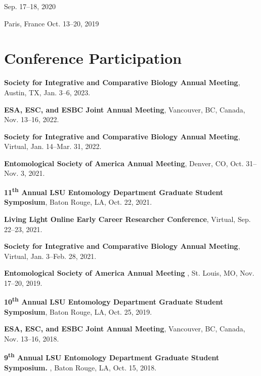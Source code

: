 \documentclass{article}
\newcommand{\ts}{\textsuperscript}
\newcommand{\hindent}{\hangindent=10pt}
\begin{document}
{Sep. 17--18, 2020}

{Paris, France}
{Oct. 13--20, 2019}




\section{Conference Participation}
\newcommand{\conference}[3]{
    \noindent
    \hindent
    \small
    \textbf{#1}, %
    {#3}, %
    {#2}. %
    \normalsize \par
}

\conference{Society for Integrative and Comparative Biology Annual Meeting}
{Jan. 3--6, 2023}
{Austin, TX}

\conference{ESA, ESC, and ESBC Joint Annual Meeting}
{Nov. 13--16, 2022}
{Vancouver, BC, Canada}

\conference{Society for Integrative and Comparative Biology Annual Meeting}
{Jan. 14--Mar. 31, 2022}
{Virtual}

\conference{Entomological Society of America Annual Meeting}
{Oct. 31--Nov. 3, 2021}
{Denver, CO}

\conference{11\ts{th} Annual LSU Entomology Department Graduate Student Symposium}
{Oct. 22, 2021}
{Baton Rouge, LA}

\conference{Living Light Online Early Career Researcher Conference}
{Sep. 22--23, 2021}
{Virtual}

\conference{Society for Integrative and Comparative Biology Annual Meeting}
{Jan. 3--Feb. 28, 2021}
{Virtual}

\conference{Entomological Society of America Annual Meeting }
{Nov. 17--20, 2019}
{St. Louis, MO}

\conference{10\ts{th} Annual LSU Entomology Department Graduate Student Symposium}
{Oct. 25, 2019}
{Baton Rouge, LA}

\conference{ESA, ESC, and ESBC Joint Annual Meeting}
{Nov. 13--16, 2018}
{Vancouver, BC, Canada}

\conference{9\ts{th} Annual LSU Entomology Department Graduate Student Symposium. }
{Oct. 15, 2018}
{Baton Rouge, LA}
\end{document}
